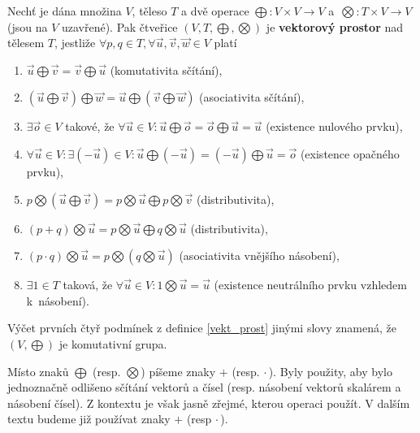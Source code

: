 \begin{definition}\label{vekt_prost}
    Nechť je dána množina $V$, těleso $T$ a dvě operace $\bigoplus\colon V\times V \to V$ a~$\bigotimes\colon T\times V \to V$ (jsou na $V$ uzavřené). Pak čtveřice $(V,T,\bigoplus,
    \bigotimes)$ je \textbf{vektorový prostor} nad tělesem $T$, jestliže $\forall p,q \in T, \forall \vec u,
    \vec v, \vec w \in V$ platí
    \begin{enumerate}[$i.$]
    \item $\vec u \bigoplus \vec v = \vec v \bigoplus \vec u$ (komutativita sčítání),
   	\item $(\vec u \bigoplus \vec v)\bigoplus \vec w = \vec u \bigoplus (\vec v \bigoplus \vec w)$ (asociativita sčítání),
   	\item $\exists \vec o\in V$ takové, že $\forall \vec u\in V\colon\vec u \bigoplus \vec o = \vec o \bigoplus \vec u = \vec u$ (existence nulového prvku),
   	\item $\forall \vec u \in V\colon \exists (-\vec u) \in V\colon \vec u \bigoplus (-\vec u) = (-\vec u) \bigoplus \vec u = \vec o$ (existence opačného prvku),
   	\item $p\bigotimes (\vec u \bigoplus \vec v)=p\bigotimes \vec u \bigoplus p\bigotimes \vec v$ (distributivita),
   	\item $(p+q)\bigotimes \vec u=p\bigotimes \vec u \bigoplus q\bigotimes \vec u$ (distributivita),
   	\item $(p\cdot q)\bigotimes \vec u = p\bigotimes (q\bigotimes \vec u)$ (asociativita vnějšího násobení),
   	\item $\exists 1 \in T$ taková, že $\forall \vec u \in V\colon 1\bigotimes \vec u = \vec u$ (existence neutrálního prvku vzhledem k~násobení).
    \end{enumerate}
\end{definition}

\begin{pozn}
    Výčet prvních čtyř podmínek z definice \ref{vekt_prost} jinými slovy znamená, že $(V,\bigoplus)$ je komutativní grupa.
\end{pozn}

\begin{pozn}
    Místo znaků $\bigoplus$ (resp. $\bigotimes$) píšeme znaky $+$ (resp. $\cdot \,$).
    Byly použity, aby bylo jednoznačně odlišeno sčítání vektorů a čísel (resp. násobení
    vektorů skalárem a násobení čísel). Z kontextu je však jasně zřejmé, kterou operaci
    použít. V dalším textu budeme již používat znaky $+$ (resp $\cdot \,$).
\end{pozn}

